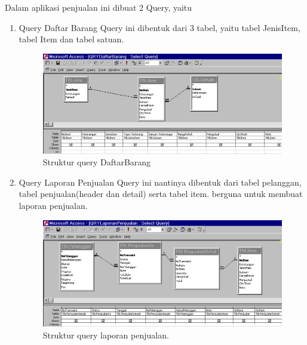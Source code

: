 \documentclass{article}
\begin{document}
Dalam aplikasi penjualan ini dibuat 2 Query, yaitu 
\begin{enumerate}
    \item Query Daftar Barang \newline
    Query ini dibentuk dari 3 tabel, yaitu tabel JenisItem, tabel Item dan tabel satuan.
    \begin{figure}[htp]
        \centering
        \includegraphics[width=11cm]{gambar_4_2.png}
        \caption{Struktur query DaftarBarang}
        \label{fig:42}
    \end{figure}
    \item Query Laporan Penjualan \newline
    Query ini nantinya dibentuk dari tabel pelanggan, tabel penjualan(header dan detail) serta tabel item. berguna untuk membuat laporan penjualan.
    \begin{figure}[htp]
        \centering
        \includegraphics[width=11cm]{gambar_4_3.png}
        \caption{Struktur query laporan penjualan.}
        \label{fig:43}
    \end{figure}
\end{enumerate}
\end{document}
